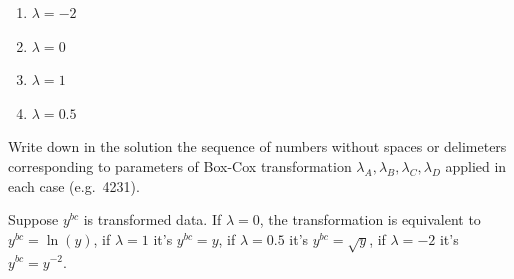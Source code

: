 \begin{question}
\begin{enumerate}
\def\labelenumi{\arabic{enumi}.}
\item
  \(\lambda=-2\)
\item
  \(\lambda=0\)
\item
  \(\lambda=1\)
\item
  \(\lambda=0.5\)
\end{enumerate}

Write down in the solution the sequence of numbers without spaces or delimeters corresponding to parameters of Box-Cox transformation \(\lambda_A,\lambda_B,\lambda_C,\lambda_D\) applied in each case (e.g.~4231).
\end{question}

\begin{solution}
Suppose \(y^{bc}\) is transformed data. If \(\lambda=0\), the transformation is equivalent to \(y^{bc}=\ln(y)\), if \(\lambda=1\) it's \(y^{bc}=y\), if \(\lambda=0.5\) it's \(y^{bc}=\sqrt{y}\), if \(\lambda=-2\) it's \(y^{bc}=y^{-2}\).
\end{solution}

